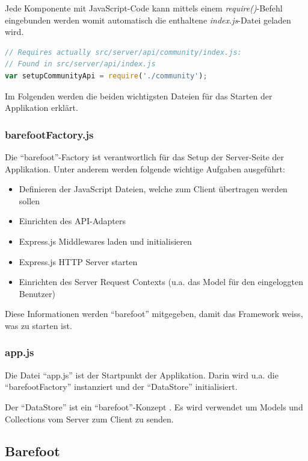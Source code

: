 Jede Komponente mit JavaScript-Code kann mittels einem \emph{require()}-Befehl eingebunden werden womit automatisch die enthaltene \emph{index.js}-Datei geladen wird.

\newpage
\begin{lstlisting}[language=JavaScript, caption=Einbindung der Community-Komponente]
// Requires actually src/server/api/community/index.js:
// Found in src/server/api/index.js
var setupCommunityApi = require('./community');
\end{lstlisting}

Im Folgenden werden die beiden wichtigsten Dateien für das Starten der Applikation erklärt.

\subsubsection*{barefootFactory.js}
Die ``barefoot''-Factory \cite{barefootFactoryjs} ist verantwortlich für das Setup der Server-Seite der Applikation.
Unter anderem werden folgende wichtige Aufgaben ausgeführt:
\begin{itemize}
	\item Definieren der JavaScript Dateien, welche zum Client übertragen werden sollen
	\item Einrichten des API-Adapters
	\item Express.js \cite{Expressjs} Middlewares laden und initialisieren
	\item Express.js \cite{Expressjs} HTTP Server starten
	\item Einrichten des Server Request Contexts (u.a. das Model für den eingeloggten Benutzer)
\end{itemize}

Diese Informationen werden ``barefoot'' \cite{Barefoot} mitgegeben, damit das Framework weiss, was zu starten ist.

\subsubsection*{app.js}
Die Datei ``app.js'' \cite{appjs} ist der Startpunkt der Applikation.
Darin wird u.a. die ``barefootFactory'' instanziert und der ``DataStore'' initialisiert.

Der ``DataStore'' ist ein ``barefoot''-Konzept \cite{barefootDatastore}. Es wird verwendet um Models und Collections vom Server zum Client zu senden.

\newpage
\subsection{Barefoot}

